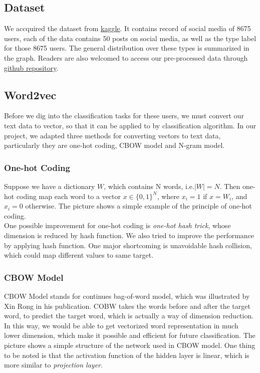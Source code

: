 \documentclass{article}
\begin{document}
\subsection{Dataset}
We accquired the dataset from \href{https://www.kaggle.com/datasnaek/mbti-type}{kaggle}. It contains record of social media of 8675 users, each of the data contains 50 posts on social media, as well as the type label for those 8675 users. The general distribution over these types is summarized in the graph. Readers are also welcomed to access our pre-processed data through \href{https://github.com/Martin4115/SI151_Project}{github repository}.

\subsection{Word2vec}
Before we dig into the classification tasks for these users, we must convert our text data to vector, so that it can be applied to by classification algorithm. In our project, we adapted three methods for converting vectors to text data, particularly they are one-hot coding, CBOW model and N-gram model.

\subsubsection{One-hot Coding}
Suppose we have a dictionary $W$, which contains N words, i.e.$|W|=N$. Then one-hot coding map each word to a vector $x \in \{0,1\}^N$, where $x_i=1$ if $x=W_i$, and $x_i=0$ otherwise. The picture shows a simple example of the principle of one-hot coding.\\
One possible improvement for one-hot coding is \emph{one-hot hash trick}, whose dimension is reduced by hash function. We also tried to improve the performance by applying hash function. One major shortcoming is unavoidable hash collision, which could map different values to same target.

\subsubsection{CBOW Model}
CBOW Model stands for continues bag-of-word model, which was illustrated by Xin Rong in his publication. COBW takes the words before and after the target word, to predict the target word, which is actually a way of dimension reduction. In this way, we would be able to get vectorized word representation in much lower dimension, which make it possible and efficient for future classification. The picture shows a simple structure of the network used in CBOW model. One thing to be noted is that the activation function of the hidden layer is linear, which is more similar to \emph{projection layer}.
\end{document}
